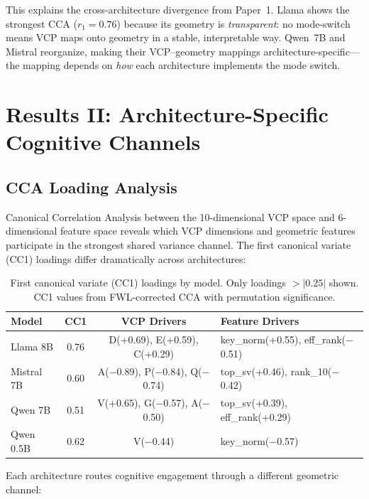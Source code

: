 \documentclass[11pt,a4paper]{article}
\begin{document}
This explains the cross-architecture divergence from Paper~1. Llama shows the strongest CCA ($r_1 = 0.76$) because its geometry is \emph{transparent}: no mode-switch means VCP maps onto geometry in a stable, interpretable way. Qwen~7B and Mistral reorganize, making their VCP--geometry mappings architecture-specific---the mapping depends on \emph{how} each architecture implements the mode switch.

\section{Results II: Architecture-Specific Cognitive Channels}

\subsection{CCA Loading Analysis}
\label{sec:cca_loadings}

Canonical Correlation Analysis between the 10-dimensional VCP space and 6-dimensional feature space reveals which VCP dimensions and geometric features participate in the strongest shared variance channel. The first canonical variate (CC1) loadings differ dramatically across architectures:

\begin{table}[H]
\centering
\caption{First canonical variate (CC1) loadings by model. Only loadings $> |0.25|$ shown. CC1 values from FWL-corrected CCA with permutation significance.}
\label{tab:cca_loadings}
\begin{tabular}{lccl}
\toprule
\textbf{Model} & \textbf{CC1} & \textbf{VCP Drivers} & \textbf{Feature Drivers} \\
\midrule
Llama 8B   & 0.76 & D(+0.69), E(+0.59), C(+0.29) & key\_norm(+0.55), eff\_rank($-$0.51) \\
Mistral 7B & 0.60 & A($-$0.89), P($-$0.84), Q($-$0.74) & top\_sv(+0.46), rank\_10($-$0.42) \\
Qwen 7B    & 0.51 & V(+0.65), G($-$0.57), A($-$0.50) & top\_sv(+0.39), eff\_rank(+0.29) \\
Qwen 0.5B  & 0.62 & V($-$0.44) & key\_norm($-$0.57) \\
\bottomrule
\end{tabular}
\end{table}

Each architecture routes cognitive engagement through a different geometric channel:
\end{document}
